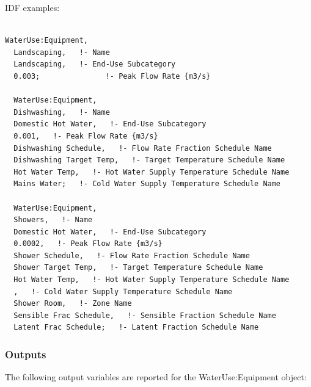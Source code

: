IDF examples:

\begin{lstlisting}

WaterUse:Equipment,
  Landscaping,   !- Name
  Landscaping,   !- End-Use Subcategory
  0.003;               !- Peak Flow Rate {m3/s}

  WaterUse:Equipment,
  Dishwashing,   !- Name
  Domestic Hot Water,   !- End-Use Subcategory
  0.001,   !- Peak Flow Rate {m3/s}
  Dishwashing Schedule,   !- Flow Rate Fraction Schedule Name
  Dishwashing Target Temp,   !- Target Temperature Schedule Name
  Hot Water Temp,   !- Hot Water Supply Temperature Schedule Name
  Mains Water;   !- Cold Water Supply Temperature Schedule Name

  WaterUse:Equipment,
  Showers,   !- Name
  Domestic Hot Water,   !- End-Use Subcategory
  0.0002,   !- Peak Flow Rate {m3/s}
  Shower Schedule,   !- Flow Rate Fraction Schedule Name
  Shower Target Temp,   !- Target Temperature Schedule Name
  Hot Water Temp,   !- Hot Water Supply Temperature Schedule Name
  ,   !- Cold Water Supply Temperature Schedule Name
  Shower Room,   !- Zone Name
  Sensible Frac Schedule,   !- Sensible Fraction Schedule Name
  Latent Frac Schedule;   !- Latent Fraction Schedule Name
\end{lstlisting}

\subsubsection{Outputs}\label{outputs-041}

The following output variables are reported for the WaterUse:Equipment object:

